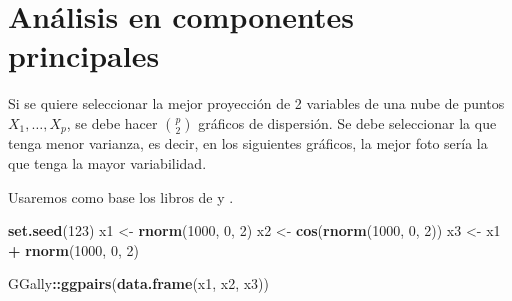 \documentclass[
  12pt,
]{book}
\newenvironment{Shaded}{\begin{snugshade}}{\end{snugshade}}
\newcommand{\DataTypeTok}[1]{\textcolor[rgb]{0.13,0.29,0.53}{#1}}
\newcommand{\DecValTok}[1]{\textcolor[rgb]{0.00,0.00,0.81}{#1}}
\newcommand{\KeywordTok}[1]{\textcolor[rgb]{0.13,0.29,0.53}{\textbf{#1}}}
\newcommand{\NormalTok}[1]{#1}
\newcommand{\OperatorTok}[1]{\textcolor[rgb]{0.81,0.36,0.00}{\textbf{#1}}}
\newcommand{\StringTok}[1]{\textcolor[rgb]{0.31,0.60,0.02}{#1}}
\theoremstyle{definition}
\theoremstyle{definition}
\theoremstyle{definition}
\theoremstyle{remark}
\begin{document}
\hypertarget{anuxe1lisis-en-componentes-principales}{%
\chapter{Análisis en componentes principales}\label{anuxe1lisis-en-componentes-principales}}

Si se quiere seleccionar la mejor proyección de 2 variables de una nube de puntos \(X_1,\dots, X_p\), se debe hacer \(\binom{p}{2}\) gráficos de dispersión. Se debe seleccionar la que tenga menor varianza, es decir, en los siguientes gráficos, la mejor foto sería la que tenga la mayor variabilidad.

Usaremos como base los libros de \autocite{HussonExploratory2017} y \autocite{James2013b}.

\begin{Shaded}
\end{Shaded}

\begin{Shaded}
\begin{Highlighting}[]
\KeywordTok{set.seed}\NormalTok{(}\DecValTok{123}\NormalTok{)}
\NormalTok{x1 <-}\StringTok{ }\KeywordTok{rnorm}\NormalTok{(}\DecValTok{1000}\NormalTok{, }\DecValTok{0}\NormalTok{, }\DecValTok{2}\NormalTok{)}
\NormalTok{x2 <-}\StringTok{ }\KeywordTok{cos}\NormalTok{(}\KeywordTok{rnorm}\NormalTok{(}\DecValTok{1000}\NormalTok{, }\DecValTok{0}\NormalTok{, }\DecValTok{2}\NormalTok{))}
\NormalTok{x3 <-}\StringTok{ }\NormalTok{x1 }\OperatorTok{+}\StringTok{ }\KeywordTok{rnorm}\NormalTok{(}\DecValTok{1000}\NormalTok{, }\DecValTok{0}\NormalTok{, }\DecValTok{2}\NormalTok{)}
\end{Highlighting}
\end{Shaded}

\begin{Shaded}
\begin{Highlighting}[]
\NormalTok{GGally}\OperatorTok{::}\KeywordTok{ggpairs}\NormalTok{(}\KeywordTok{data.frame}\NormalTok{(x1, x2, x3))}
\end{Highlighting}
\end{Shaded}
\end{document}
